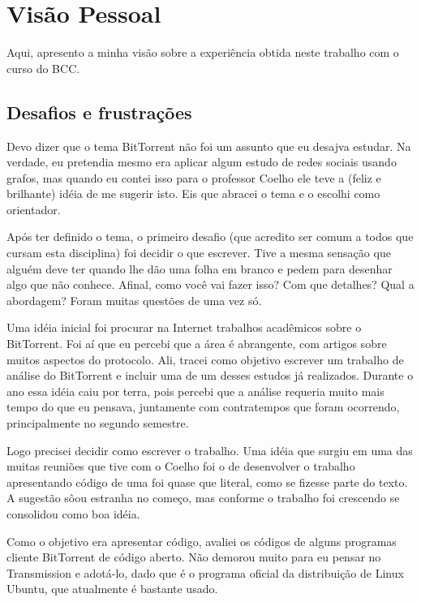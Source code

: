 
\chapter*{Visão Pessoal}

Aqui, apresento a minha visão sobre a experiência obtida neste trabalho com o curso do
BCC.

\section*{Desafios e frustrações}

Devo dizer que o tema BitTorrent não foi um assunto que eu desajva estudar. Na verdade,
eu pretendia mesmo era aplicar algum estudo de redes sociais usando grafos, mas quando
eu contei isso para o professor Coelho ele teve a (feliz e brilhante) idéia de me
sugerir isto. Eis que abracei o tema e o escolhi como orientador.

Após ter definido o tema, o primeiro desafio (que acredito ser comum a todos que cursam
esta disciplina) foi decidir o que escrever. Tive a mesma sensação que alguém deve ter
quando lhe dão uma folha em branco e pedem para desenhar algo que não conhece. Afinal,
como você vai fazer isso? Com que detalhes? Qual a abordagem? Foram muitas questões de
uma vez só.

Uma idéia inicial foi procurar na Internet trabalhos acadêmicos sobre o BitTorrent. Foi
aí que eu percebi que a área é abrangente, com artigos sobre muitos aspectos do
protocolo. Ali, tracei como objetivo escrever um trabalho de análise do BitTorrent e
incluir uma de um desses estudos já realizados. Durante o ano essa idéia caiu por terra,
pois percebi que a análise requeria muito mais tempo do que eu pensava, juntamente com
contratempos que foram ocorrendo, principalmente no segundo semestre.

Logo precisei decidir como escrever o trabalho. Uma idéia que surgiu em uma das muitas
reuniões que tive com o Coelho foi o de desenvolver o trabalho apresentando código de
uma foi quase que literal, como se fizesse parte do texto. A sugestão sôou estranha no
começo, mas conforme o trabalho foi crescendo se consolidou como boa idéia.

Como o objetivo era apresentar código, avaliei os códigos de alguns programas cliente
BitTorrent de código aberto. Não demorou muito para eu pensar no Transmission e
adotá-lo, dado que é o programa oficial da distribuição de Linux Ubuntu, que atualmente
é bastante usado.

